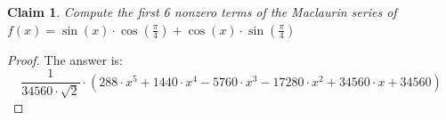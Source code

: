 \documentclass{article}
\newtheorem{theorem}{Claim}
\begin{document}
\begin{theorem}
Compute the first 6 nonzero terms of the Maclaurin series of $f(x) = \sin(x) \cdot \cos\left(\frac{ \pi }{ 4 }\right) + \cos(x) \cdot \sin\left(\frac{ \pi }{ 4 }\right)$
\end{theorem}

\begin{proof}
The answer is:
\[
\frac{1}{34560\cdot\sqrt{2}}\cdot\left(288\cdot x^5+1440\cdot x^4-5760\cdot x^3-17280\cdot x^2+34560\cdot x+34560\right)
\]
\end{proof}
\end{document}
